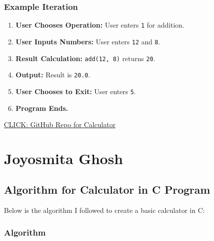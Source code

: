 \documentclass{article}
\begin{document}
\subsubsection*{Example Iteration}

\begin{enumerate}
    \item \textbf{User Chooses Operation:} User enters \texttt{1} for addition.
    \item \textbf{User Inputs Numbers:} User enters \texttt{12} and \texttt{8}.
    \item \textbf{Result Calculation:} \texttt{add(12, 8)} returns \texttt{20}.
    \item \textbf{Output:} Result is \texttt{20.0}.
    \item \textbf{User Chooses to Exit:} User enters \texttt{5}.
    \item \textbf{Program Ends.}
\end{enumerate}

\href{https://github.com/Anushka2127/calculator_anushka}{CLICK: GitHub Repo for Calculator}

\newpage
\section{Joyosmita Ghosh}

\subsection{Algorithm for Calculator in C Program}

Below is the algorithm I followed to create a basic calculator in C:

\subsubsection*{Algorithm}
\end{document}
